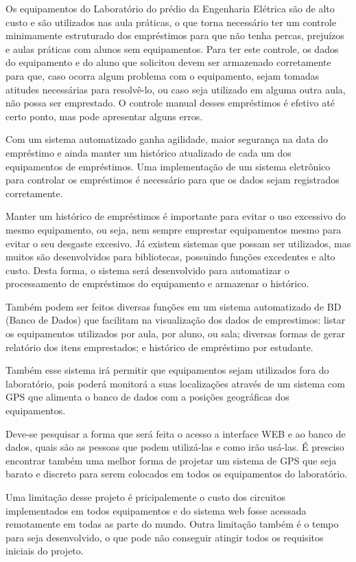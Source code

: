 \vspace{-42pt}
Os equipamentos do Laboratório do prédio da Engenharia Elétrica são de alto custo e são utilizados nas aula práticas, o que torna necessário ter um controle minimamente estruturado dos empréstimos para que não tenha percas, prejuízos e aulas práticas com alunos sem equipamentos. Para ter este controle, os dados do equipamento e do aluno que solicitou devem ser armazenado corretamente para que, caso ocorra algum problema com o equipamento, sejam tomadas atitudes necessárias para resolvê-lo, ou caso seja utilizado em alguma outra aula, não possa ser emprestado. O controle manual desses empréstimos é efetivo até certo ponto, mas pode apresentar alguns erros.

Com um sistema automatizado ganha agilidade, maior segurança na data do empréstimo e ainda manter um histórico atualizado de cada um dos equipamentos de empréstimos. Uma implementação de um sistema eletrônico para controlar os empréstimos é necessário para que os dados sejam registrados corretamente.

Manter um histórico de empréstimos é importante para evitar o uso excessivo do mesmo equipamento, ou seja, nem sempre emprestar equipamentos mesmo para evitar o seu desgaste excesivo. Já existem sistemas que possam ser utilizados, mas muitos são desenvolvidos para bibliotecas, possuindo funções excedentes e alto custo. Desta forma, o sistema será desenvolvido para automatizar o processamento de empréstimos do equipamento e armazenar o histórico. 

Também podem ser feitos diversas funções em um sistema automatizado de BD (Banco de Dados) que facilitam na visualização dos dados de emprestimos: listar os equipamentos utilizados por aula, por aluno, ou sala; diversas formas de gerar relatório dos itens emprestados; e histórico de empréstimo por estudante.

Também esse sistema irá permitir que equipamentos sejam utilizados fora do laboratório, pois poderá monitorá a suas localizações através de um sistema com GPS que alimenta o banco de dados com a posições geográficas dos equipamentos.

Deve-se pesquisar a forma que será feita o acesso a interface WEB e ao banco de dados, quais são as pessoas que podem utilizá-las e como irão usá-las. É presciso encontrar também uma melhor forma de projetar um sistema de GPS que seja barato e discreto para serem colocados em todos os equipamentos do laboratório.

Uma limitação desse projeto é pricipalemente o custo dos circuitos implementados em todos equipamentos e do sistema web fosse acessada remotamente em todas as parte do mundo. Outra limitação também é o tempo para seja desenvolvido, o que pode não conseguir atingir todos os requisitos iniciais do projeto.